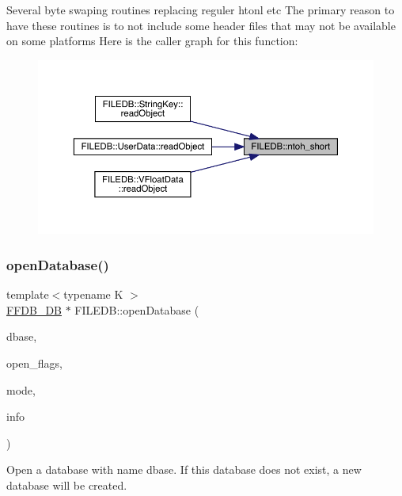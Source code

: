 Several byte swaping routines replacing reguler htonl etc The primary reason to have these routines is to not include some header files that may not be available on some platforms Here is the caller graph for this function\+:\nopagebreak
\begin{figure}[H]
\begin{center}
\leavevmode
\includegraphics[width=350pt]{d2/de6/namespaceFILEDB_af28aef063f95fcb331d3844f6807daf5_icgraph}
\end{center}
\end{figure}
\mbox{\label{namespaceFILEDB_a9ed602db52c9c9d3bbf1324426376c72}} 
\subsubsection{\texorpdfstring{openDatabase()}{openDatabase()}}
{\footnotesize\ttfamily template$<$typename K $>$ \\
\mbox{\hyperlink{other__libs_2filedb_2filehash_2ffdb__db_8h_a0b27b956926453a7a8141ea8e10f0df8}{F\+F\+D\+B\+\_\+\+DB}} $\ast$ F\+I\+L\+E\+D\+B\+::open\+Database (\begin{DoxyParamCaption}\item[{const std\+::string \&}]{dbase,  }\item[{int}]{open\+\_\+flags,  }\item[{int}]{mode,  }\item[{\mbox{\hyperlink{structFFDB__HASHINFO}{F\+F\+D\+B\+\_\+\+H\+A\+S\+H\+I\+N\+FO}} $\ast$}]{info }\end{DoxyParamCaption})}

Open a database with name dbase. If this database does not exist, a new database will be created.


